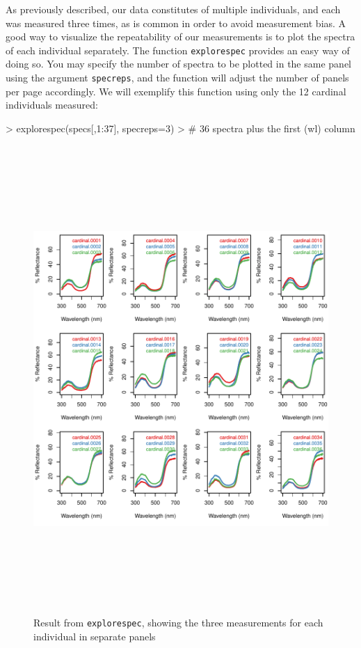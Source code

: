 \documentclass{article}
\newcommand{\code}[1]{{\tt #1}}  %
\begin{document}
As previously described, our data constitutes of multiple individuals, and each was measured 
three times, as is common in order to avoid measurement bias. A good way to visualize the 
repeatability of our measurements is to plot the spectra of each individual separately. The 
function \code{explorespec} provides an easy way of doing so. You may specify the number of 
spectra to be plotted in the same panel using the argument \code{specreps}, and the function 
will adjust the number of panels per page accordingly. We will exemplify this function using 
only the 12 cardinal individuals measured:

\begin{Schunk}
\begin{Sinput}
> explorespec(specs[,1:37], specreps=3) 
> # 36 spectra plus the first (wl) column
\end{Sinput}
\end{Schunk}

\begin{figure}[H] %
\begin{center}
\includegraphics[width=6in, height=7in]{pavo-explorespecfig}
\end{center}
\caption{Result from \code{explorespec}, showing the three measurements for each individual in separate panels}
\label{figure:explorespec}
\end{figure}
\end{document}
